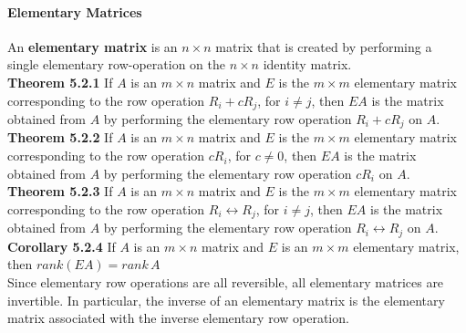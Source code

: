 \documentclass[10pt,letter]{article}
\begin{document}
\paragraph{Elementary Matrices} An \textbf{elementary matrix} is an $n\times n$ matrix that is created by performing a single elementary row-operation on the $n\times n$ identity matrix. \\ 
\textbf{Theorem 5.2.1} If $A$ is an $m\times n$ matrix and $E$ is the $m\times m$ elementary matrix corresponding to the row operation $R_i+cR_j$, for $i\neq j$, then $EA$ is the matrix obtained from $A$ by performing the elementary row operation $R_i+cR_j$ on $A$.\\
\textbf{Theorem 5.2.2} If $A$ is an $m\times n$ matrix and $E$ is the $m\times m$ elementary matrix corresponding to the row operation $cR_i$, for $c\neq0$, then $EA$ is the matrix obtained from $A$ by performing the elementary row operation $cR_i$ on $A$. \\
\textbf{Theorem 5.2.3} If $A$ is an $m\times n$ matrix and $E$ is the $m\times m$ elementary matrix corresponding to the row operation $R_i\leftrightarrow R_j$, for $i\neq j$, then $EA$ is the matrix obtained from $A$ by performing the elementary row operation $R_i\leftrightarrow R_j$ on $A$. \\
\textbf{Corollary 5.2.4} If $A$ is an $m\times n$ matrix and $E$ is an $m\times m$ elementary matrix, then $rank(EA)=rank\,A$\\
Since elementary row operations are all reversible, all elementary matrices are invertible. In particular, the inverse of an elementary matrix is the elementary matrix associated with the inverse elementary row operation. 
\end{document}
